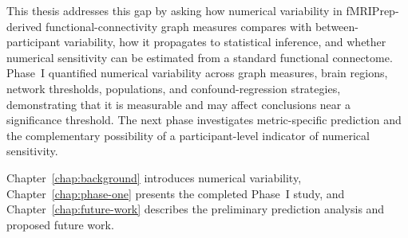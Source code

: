 This thesis addresses this gap by asking how numerical variability in fMRIPrep-derived functional-connectivity graph measures compares with between-participant variability, how it propagates to statistical inference, and whether numerical sensitivity can be estimated from a standard functional connectome. Phase~I quantified numerical variability across graph measures, brain regions, network thresholds, populations, and confound-regression strategies, demonstrating that it is measurable and may affect conclusions near a significance threshold. The next phase investigates metric-specific prediction and the complementary possibility of a participant-level indicator of numerical sensitivity.

Chapter~\ref{chap:background} introduces numerical variability, Chapter~\ref{chap:phase-one} presents the completed Phase~I study, and Chapter~\ref{chap:future-work} describes the preliminary prediction analysis and proposed future work.
